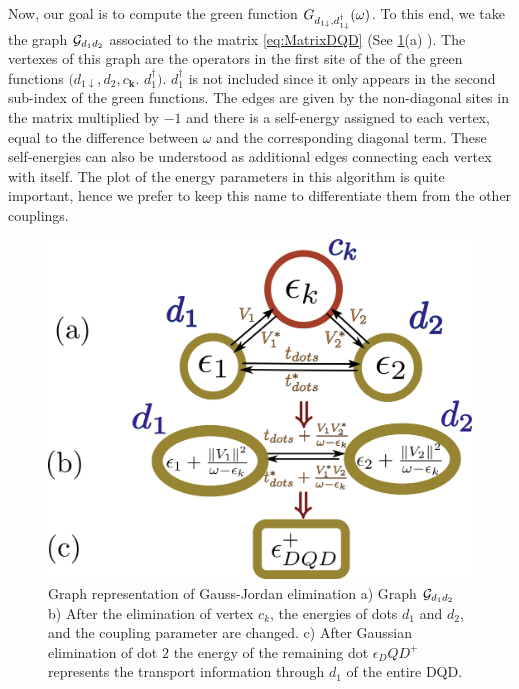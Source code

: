 Now, our goal is to compute the green function  $G_{d_{1\downarrow},d_{1\downarrow}^{\dagger}}(\omega)$.  To this end, we take the graph $\mathcal{G}_{d_1d_2}$ associated to the matrix  \eqref{eq:MatrixDQD} (See \ref{fig:graphDQD}(a) ).  The vertexes of this graph are the operators in the first site of the of the green functions  $(d_{1\downarrow},d_{2},c_{\boldsymbol{k}}$. $d_1^\dagger)$. $d^\dagger_1$ is not included since it only appears in the second sub-index of the green functions. The edges are given by the non-diagonal sites in the matrix  multiplied by $-1$ and there is a self-energy assigned to each vertex, equal to the difference between $\omega$  and the corresponding diagonal term. These self-energies can also be understood as additional edges connecting each vertex with itself. The plot of the energy parameters in this algorithm is quite important, hence we prefer to keep this name to differentiate them from the other couplings.  

\begin{figure}[t]
    \centering
    \includegraphics[scale=0.3]{IMAGES/Graphs/DQD-Pro.png}
    \caption{  \label{fig:graphDQD} Graph representation of Gauss-Jordan elimination a) Graph $\mathcal{G}_{d_1d_2}$ b) After the elimination of vertex $c_k$, the energies of dots $d_1$ and $d_2$, and the coupling parameter are changed. c) After Gaussian elimination of dot $2$ the energy of the remaining dot $\epsilon_DQD^+$ represents the transport information through $d_1$ of the entire DQD. \protect\Source{}}
    
\end{figure}



